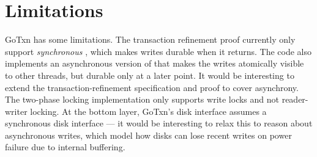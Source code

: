 





\section{Limitations}
\label{sec:txn:limitations}

GoTxn has some limitations. The transaction refinement proof currently only support
\emph{synchronous} , which makes writes durable when it returns. The
code also implements an asynchronous version of  that makes the
writes atomically visible to other threads, but durable only at a later point.
It would be interesting to extend the transaction-refinement specification and proof
to cover asynchrony. The two-phase locking implementation only supports write
locks and not reader-writer locking. At the bottom layer, GoTxn's disk interface
assumes a synchronous disk interface --- it would be interesting to relax this
to reason about asynchronous writes, which model how disks can lose recent
writes on power failure due to internal buffering.


